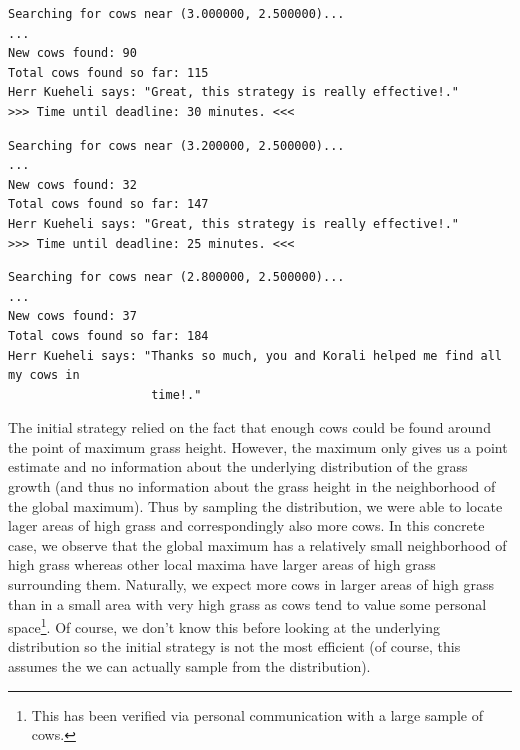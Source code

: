 \documentclass{article}
\begin{document}
    \begin{lstlisting}[basicstyle=\tiny, frame=single,
    caption={Terminal output for $check\_cows$ for the coordinates of the
    maximum observed in Figure~\ref{fig:GrassHeight}.},
    label={lst:CowsOpt}]
Searching for cows near (3.000000, 2.500000)...
...
New cows found: 90
Total cows found so far: 115
Herr Kueheli says: "Great, this strategy is really effective!."
>>> Time until deadline: 30 minutes. <<<
    \end{lstlisting}
    \begin{lstlisting}[basicstyle=\tiny, frame=single,
    caption={Terminal output for $check\_cows$ for a point in the
    neighborhood of the maximum observed in Figure~\ref{fig:GrassHeight}.},
    label={lst:CowsOptRight}]
Searching for cows near (3.200000, 2.500000)...
...
New cows found: 32
Total cows found so far: 147
Herr Kueheli says: "Great, this strategy is really effective!."
>>> Time until deadline: 25 minutes. <<<
    \end{lstlisting}
    \begin{lstlisting}[basicstyle=\tiny, frame=single,
    caption={Terminal output for $check\_cows$ for a point in the
    neighborhood of the maximum observed in Figure~\ref{fig:GrassHeight}.},
    label={lst:CowsOptLeft}]
Searching for cows near (2.800000, 2.500000)...
...
New cows found: 37
Total cows found so far: 184
Herr Kueheli says: "Thanks so much, you and Korali helped me find all my cows in
                    time!."
    \end{lstlisting}

    The initial strategy relied on the fact that enough cows could be found
    around the point of maximum grass height.
    However, the maximum only gives us a point estimate and no information
    about the underlying distribution of the grass growth (and thus no
    information about the grass height in the neighborhood of the global
    maximum).
    Thus by sampling the distribution, we were able to locate lager areas
    of high grass and correspondingly also more cows.
    In this concrete case, we observe that the global maximum has a
    relatively small neighborhood of high grass whereas other local maxima
    have larger areas of high grass surrounding them.
    Naturally, we expect more cows in larger areas of high grass than in a
    small area with very high grass as cows tend to value some personal
    space\footnote{This has been verified via personal communication with a
    large sample of cows.}.
    Of course, we don't know this before looking at the underlying distribution
    so the initial strategy is not the most efficient (of course, this
    assumes the we can actually sample from the distribution).
\end{document}
